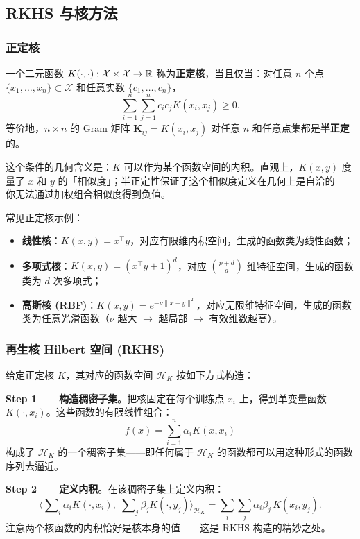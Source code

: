 \subsection{RKHS 与核方法}

\subsubsection{正定核}

一个二元函数 $K(\cdot,\cdot): \mathcal{X} \times \mathcal{X} \to \mathbb{R}$ 称为\textbf{正定核}，当且仅当：对任意 $n$ 个点 $\{x_1,\ldots,x_n\} \subset \mathcal{X}$ 和任意实数 $\{c_1,\ldots,c_n\}$，
\begin{equation}\label{eq:psd_kernel}
    \sum_{i=1}^{n}\sum_{j=1}^{n} c_i c_j K(x_i, x_j) \ge 0.
\end{equation}
等价地，$n \times n$ 的 Gram 矩阵 $\mathbf{K}_{ij} = K(x_i, x_j)$ 对任意 $n$ 和任意点集都是\textbf{半正定}的。

这个条件的几何含义是：$K$ 可以作为某个函数空间的内积。直观上，$K(x,y)$ 度量了 $x$ 和 $y$ 的「相似度」；半正定性保证了这个相似度定义在几何上是自洽的——你无法通过加权组合相似度得到负值。

常见正定核示例：
\begin{itemize}
    \item \textbf{线性核}：$K(x,y) = x^\top y$，对应有限维内积空间，生成的函数类为线性函数；
    \item \textbf{多项式核}：$K(x,y) = (x^\top y + 1)^d$，对应 $\binom{p+d}{d}$ 维特征空间，生成的函数类为 $d$ 次多项式；
    \item \textbf{高斯核 (RBF)}：$K(x,y) = e^{-\nu\|x-y\|^2}$，对应无限维特征空间，生成的函数类为任意光滑函数（$\nu$ 越大 $\to$ 越局部 $\to$ 有效维数越高）。
\end{itemize}

\subsubsection{再生核 Hilbert 空间 (RKHS)}

给定正定核 $K$，其对应的函数空间 $\mathcal{H}_K$ 按如下方式构造：

\textbf{Step 1——构造稠密子集}。把核固定在每个训练点 $x_i$ 上，得到单变量函数 $K(\cdot, x_i)$。这些函数的有限线性组合：
\[
f(x) = \sum_{i=1}^{n} \alpha_i K(x, x_i)
\]
构成了 $\mathcal{H}_K$ 的一个稠密子集——即任何属于 $\mathcal{H}_K$ 的函数都可以用这种形式的函数序列去逼近。

\textbf{Step 2——定义内积}。在该稠密子集上定义内积：
\[
\big\langle \sum\nolimits_i \alpha_i K(\cdot, x_i),\;
             \sum\nolimits_j \beta_j K(\cdot, y_j) \big\rangle_{\mathcal{H}_K}
   = \sum_i \sum_j \alpha_i \beta_j\,K(x_i, y_j).
\]
注意两个核函数的内积恰好是核本身的值——这是 RKHS 构造的精妙之处。

